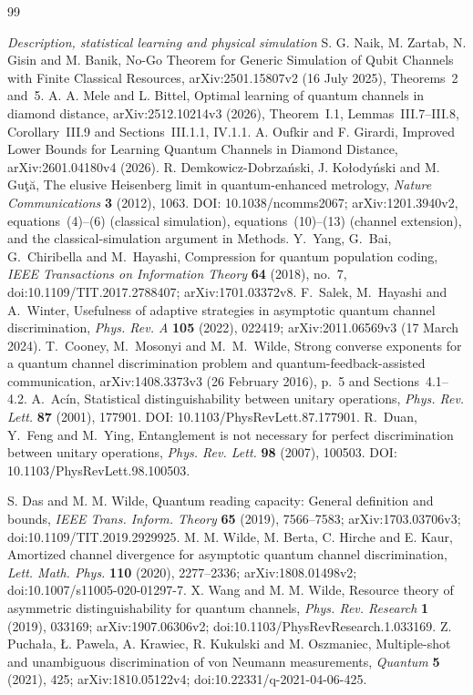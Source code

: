 \begin{thebibliography}{99}
\item[]\textit{Description, statistical learning and physical simulation}
 S. G. Naik, M. Zartab, N. Gisin and M. Banik,
No-Go Theorem for Generic Simulation of Qubit Channels with Finite
Classical Resources, arXiv:2501.15807v2 (16 July 2025),
Theorems~2 and~5.
 A. A. Mele and L. Bittel,
Optimal learning of quantum channels in diamond distance,
arXiv:2512.10214v3 (2026), Theorem~I.1, Lemmas~III.7--III.8,
Corollary~III.9 and Sections~III.1.1, IV.1.1.
 A. Oufkir and F. Girardi,
Improved Lower Bounds for Learning Quantum Channels in Diamond
Distance, arXiv:2601.04180v4 (2026).
 R. Demkowicz-Dobrza\'nski, J. Ko\l ody\'nski
and M. Gu\c{t}\u{a}, The elusive Heisenberg limit in quantum-enhanced
metrology, \emph{Nature Communications} \textbf{3} (2012), 1063.
DOI: 10.1038/ncomms2067; arXiv:1201.3940v2, equations~(4)--(6)
(classical simulation), equations~(10)--(13) (channel extension),
and the classical-simulation argument in Methods.
 Y.~Yang, G.~Bai, G.~Chiribella and M.~Hayashi,
Compression for quantum population coding,
\emph{IEEE Transactions on Information Theory} \textbf{64} (2018), no.~7,
doi:10.1109/TIT.2017.2788407;
arXiv:1701.03372v8.
 F.~Salek, M.~Hayashi and A.~Winter,
Usefulness of adaptive strategies in asymptotic quantum channel
 discrimination, \emph{Phys. Rev. A} \textbf{105} (2022), 022419;
arXiv:2011.06569v3 (17 March 2024).
 T.~Cooney, M.~Mosonyi and M.~M.~Wilde,
Strong converse exponents for a quantum channel discrimination problem
and quantum-feedback-assisted communication,
arXiv:1408.3373v3 (26 February 2016), p.~5 and Sections~4.1--4.2.
 A.~Ac\'in,
Statistical distinguishability between unitary operations,
\emph{Phys. Rev. Lett.} \textbf{87} (2001), 177901.
DOI: 10.1103/PhysRevLett.87.177901.
 R.~Duan, Y.~Feng and M.~Ying,
Entanglement is not necessary for perfect discrimination between
unitary operations, \emph{Phys. Rev. Lett.} \textbf{98} (2007), 100503.
DOI: 10.1103/PhysRevLett.98.100503.

 S. Das and M. M. Wilde,
Quantum reading capacity: General definition and bounds,
\emph{IEEE Trans. Inform. Theory} \textbf{65} (2019), 7566--7583;
arXiv:1703.03706v3; doi:10.1109/TIT.2019.2929925.
 M. M. Wilde, M. Berta, C. Hirche and E. Kaur,
Amortized channel divergence for asymptotic quantum channel discrimination,
\emph{Lett. Math. Phys.} \textbf{110} (2020), 2277--2336;
arXiv:1808.01498v2; doi:10.1007/s11005-020-01297-7.
 X. Wang and M. M. Wilde,
Resource theory of asymmetric distinguishability for quantum channels,
\emph{Phys. Rev. Research} \textbf{1} (2019), 033169;
arXiv:1907.06306v2; doi:10.1103/PhysRevResearch.1.033169.
 Z. Pucha\l a, \L. Pawela, A. Krawiec, R. Kukulski and
M. Oszmaniec, Multiple-shot and unambiguous discrimination of von Neumann
measurements, \emph{Quantum} \textbf{5} (2021), 425;
arXiv:1810.05122v4; doi:10.22331/q-2021-04-06-425.


\end{thebibliography}
